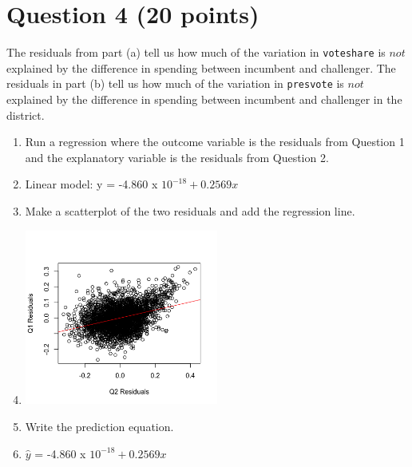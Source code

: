 \documentclass[12pt,letterpaper]{article}
\begin{document}
\section*{Question 4 (20 points)}
\noindent The residuals from part (a) tell us how much of the variation in \texttt{voteshare} is $not$ explained by the difference in spending between incumbent and challenger. The residuals in part (b) tell us how much of the variation in \texttt{presvote} is $not$ explained by the difference in spending between incumbent and challenger in the district.
	\begin{enumerate}
		\item Run a regression where the outcome variable is the residuals from Question 1 and the explanatory variable is the residuals from Question 2.
		\item[] Linear model: y = -4.860 x $10^{-18} + 0.2569x$
		
		\item Make a scatterplot of the two residuals and add the regression line.
		\item[]
		\includegraphics[width=0.5\textwidth]{Q4.png}
		
		\item Write the prediction equation.
		\item[] $\hat{y}$ = -4.860 x $10^{-18} + 0.2569x$

	\end{enumerate}
	
\end{document}
